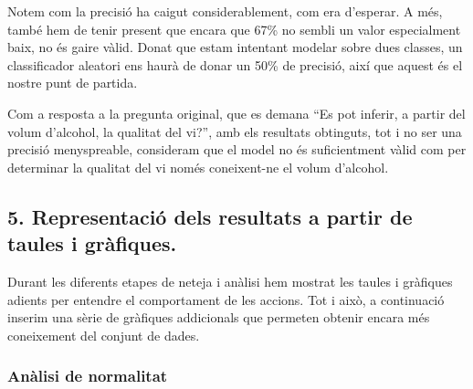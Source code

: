 \documentclass[11pt]{article}
\begin{document}
    Notem com la precisió ha caigut considerablement, com era d'esperar. A
més, també hem de tenir present que encara que 67\% no sembli un valor
especialment baix, no és gaire vàlid. Donat que estam intentant modelar
sobre dues classes, un classificador aleatori ens haurà de donar un 50\%
de precisió, així que aquest és el nostre punt de partida.

Com a resposta a la pregunta original, que es demana ``Es pot inferir, a
partir del volum d'alcohol, la qualitat del vi?'', amb els resultats
obtinguts, tot i no ser una precisió menyspreable, consideram que el
model no és suficientment vàlid com per determinar la qualitat del vi
només coneixent-ne el volum d'alcohol.

    \hypertarget{representacio-dels-resultats-a-partir-de-taules-i-grafiques.}{%
\subsection{5. Representació dels resultats a partir de taules i
gràfiques.}\label{representacio-dels-resultats-a-partir-de-taules-i-grafiques.}}

Durant les diferents etapes de neteja i anàlisi hem mostrat les taules i
gràfiques adients per entendre el comportament de les accions. Tot i
això, a continuació inserim una sèrie de gràfiques addicionals que
permeten obtenir encara més coneixement del conjunt de dades.

    \hypertarget{anuxe0lisi-de-normalitat}{%
\subsubsection{Anàlisi de normalitat}\label{anuxe0lisi-de-normalitat}}
\end{document}
